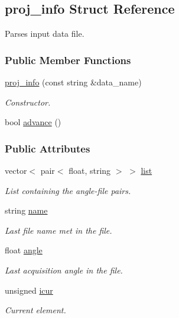 \hypertarget{structproj__info}{
\subsection{proj\_\-info Struct Reference}
\label{structproj__info}
}


Parses input data file.  


\subsubsection*{Public Member Functions}
\begin{DoxyCompactItemize}
\item 
\hyperlink{structproj__info_ae2f993e93868efcd230529bcea89484a}{proj\_\-info} (const string \&data\_\-name)
\begin{DoxyCompactList}\small\item\em Constructor. \item\end{DoxyCompactList}\item 
bool \hyperlink{structproj__info_a8c54298cf18077e22a4ecb3322028876}{advance} ()
\end{DoxyCompactItemize}
\subsubsection*{Public Attributes}
\begin{DoxyCompactItemize}
\item 
vector$<$ pair$<$ float, string $>$ $>$ \hyperlink{structproj__info_ac314c7bb7162e89f365ff571b8905882}{list}
\begin{DoxyCompactList}\small\item\em List containing the angle-\/file pairs. \item\end{DoxyCompactList}\item 
string \hyperlink{structproj__info_aefed04f549ab983feab9e6fe7cd224ca}{name}
\begin{DoxyCompactList}\small\item\em Last file name met in the file. \item\end{DoxyCompactList}\item 
float \hyperlink{structproj__info_aa99f2ca1bcc4a59d8ccd12d089ec0157}{angle}
\begin{DoxyCompactList}\small\item\em Last acquisition angle in the file. \item\end{DoxyCompactList}\item 
unsigned \hyperlink{structproj__info_a811edc2345575bc4ec481a7d4056ff8f}{icur}
\begin{DoxyCompactList}\small\item\em Current element. \item\end{DoxyCompactList}\end{DoxyCompactItemize}


